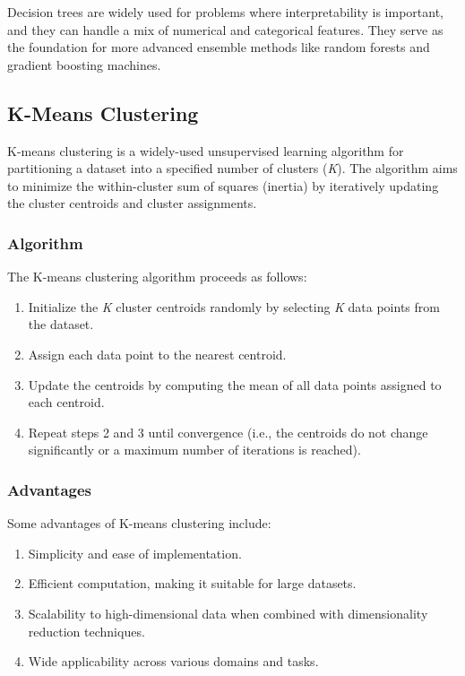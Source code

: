 \documentclass[12pt]{article}
\begin{document}
Decision trees are widely used for problems where interpretability is important, and they can handle a mix of numerical and categorical features. They serve as the foundation for more advanced ensemble methods like random forests and gradient boosting machines.


\subsection{K-Means Clustering}
K-means clustering is a widely-used unsupervised learning algorithm for partitioning a dataset into a specified number of clusters (\textit{K}). The algorithm aims to minimize the within-cluster sum of squares (inertia) by iteratively updating the cluster centroids and cluster assignments.

\subsubsection{Algorithm}
The K-means clustering algorithm proceeds as follows:
\begin{enumerate}
\item Initialize the \textit{K} cluster centroids randomly by selecting \textit{K} data points from the dataset.
\item Assign each data point to the nearest centroid.
\item Update the centroids by computing the mean of all data points assigned to each centroid.
\item Repeat steps 2 and 3 until convergence (i.e., the centroids do not change significantly or a maximum number of iterations is reached).
\end{enumerate}

\subsubsection{Advantages}
Some advantages of K-means clustering include:
\begin{enumerate}
\item Simplicity and ease of implementation.
\item Efficient computation, making it suitable for large datasets.
\item Scalability to high-dimensional data when combined with dimensionality reduction techniques.
\item Wide applicability across various domains and tasks.
\end{enumerate}
\end{document}
